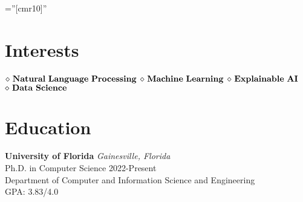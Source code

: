 \documentclass[a4paper,11pt]{article}
\begin{document}

\pagestyle{empty} %

\font\fb=''[cmr10]'' %

\par{\par}
\bigskip
\section{Interests}
$\diamond {\bf \ Natural \ Language \ Processing}$
$\diamond {\bf \ Machine \ Learning}$
$\diamond {\bf \ Explainable\ AI}$  
$\diamond {\bf \ Data \ Science}$ 




\section{Education}
{{\bf University of Florida} \hfill {\em Gainesville, Florida} 
\\{\normalsize Ph.D. in Computer Science} \hfill
 2022-Present
 \\ \small Department of Computer and Information Science and Engineering \hfill $\;$
 \\{\normalsize GPA: 3.83/4.0} \hfill }
 
\end{document}
